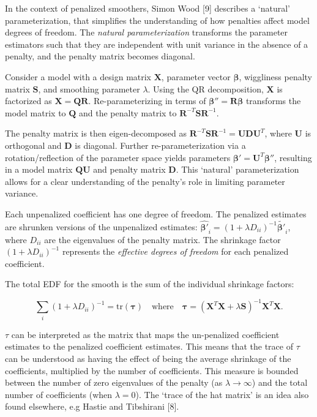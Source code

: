\documentclass[
11pt, %
oneside, %
english, %
singlespacing, %
]{macthesis} %
\begin{document}
In the context of penalized smoothers, Simon Wood {[}9{]} describes a `natural' parameterization, that simplifies the understanding of how penalties affect model degrees of freedom. The \emph{natural parameterization} transforms the parameter estimators such that they are independent with unit variance in the absence of a penalty, and the penalty matrix becomes diagonal.

Consider a model with a design matrix \(\mathbf{X}\), parameter vector \(\boldsymbol{\beta}\), wiggliness penalty matrix \(\mathbf{S}\), and smoothing parameter \(\lambda\). Using the QR decomposition, \(\mathbf{X}\) is factorized as \(\mathbf{X} = \mathbf{Q} \mathbf{R}\). Re-parameterizing in terms of \(\boldsymbol{\beta''} = \mathbf{R} \boldsymbol{\beta}\) transforms the model matrix to \(\mathbf{Q}\) and the penalty matrix to \(\mathbf{R}^{-T} \mathbf{S} \mathbf{R}^{-1}\).

The penalty matrix is then eigen-decomposed as \(\mathbf{R}^{-T} \mathbf{S} \mathbf{R}^{-1} = \mathbf{U} \mathbf{D} \mathbf{U}^T\), where \(\mathbf{U}\) is orthogonal and \(\mathbf{D}\) is diagonal. Further re-parameterization via a rotation/reflection of the parameter space yields parameters \(\boldsymbol{\beta'} = \mathbf{U}^T \boldsymbol{\beta''}\), resulting in a model matrix \(\mathbf{Q} \mathbf{U}\) and penalty matrix \(\mathbf{D}\). This `natural' parameterization allows for a clear understanding of the penalty's role in limiting parameter variance.

Each unpenalized coefficient has one degree of freedom. The penalized estimates are shrunken versions of the unpenalized estimates: \(\hat{\boldsymbol{\beta}'}_i = (1 + \lambda D_{ii})^{-1} \tilde{\boldsymbol{\beta}'}_i\), where \(D_{ii}\) are the eigenvalues of the penalty matrix. The shrinkage factor \((1 + \lambda D_{ii})^{-1}\) represents the \emph{effective degrees of freedom} for each penalized coefficient.

The total EDF for the smooth is the sum of the individual shrinkage factors:

\[
\sum_i (1 + \lambda D_{ii})^{-1} = \text{tr}(\mathbf{\tau}) \quad \text{where} \quad \mathbf{\tau} = (\mathbf{X}^T \mathbf{X} + \lambda \mathbf{S})^{-1} \mathbf{X}^T \mathbf{X}.
\]

\(\tau\) can be interpreted as the matrix that maps the un-penalized coefficient estimates to the penalized coefficient estimates. This means that the trace of \(\tau\) can be understood as having the effect of being the average shrinkage of the coefficients, multiplied by the number of coefficients. This measure is bounded between the number of zero eigenvalues of the penalty (as \(\lambda \to \infty\)) and the total number of coefficients (when \(\lambda = 0\)). The `trace of the hat matrix' is an idea also found elsewhere, e.g Hastie and Tibshirani {[}8{]}.
\end{document}
